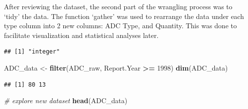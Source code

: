 \documentclass[12pt,]{article}
\newenvironment{Shaded}{\begin{snugshade}}{\end{snugshade}}
\newcommand{\KeywordTok}[1]{\textcolor[rgb]{0.13,0.29,0.53}{\textbf{#1}}}
\newcommand{\DecValTok}[1]{\textcolor[rgb]{0.00,0.00,0.81}{#1}}
\newcommand{\StringTok}[1]{\textcolor[rgb]{0.31,0.60,0.02}{#1}}
\newcommand{\CommentTok}[1]{\textcolor[rgb]{0.56,0.35,0.01}{\textit{#1}}}
\newcommand{\OperatorTok}[1]{\textcolor[rgb]{0.81,0.36,0.00}{\textbf{#1}}}
\newcommand{\NormalTok}[1]{#1}
\begin{document}
After reviewing the dataset, the second part of the wrangling process
was to `tidy' the data. The function `gather' was used to rearrange the
data under each type column into 2 new columns: ADC Type, and Quantity.
This was done to facilitate visualization and statistical analyses
later.

\begin{Shaded}
\end{Shaded}

\begin{verbatim}
## [1] "integer"
\end{verbatim}

\begin{Shaded}
\begin{Highlighting}[]
\NormalTok{ADC_data <-}\StringTok{ }\KeywordTok{filter}\NormalTok{(ADC_raw, Report.Year }\OperatorTok{>=}\StringTok{ }\DecValTok{1998}\NormalTok{)}
\KeywordTok{dim}\NormalTok{(ADC_data)}
\end{Highlighting}
\end{Shaded}

\begin{verbatim}
## [1] 80 13
\end{verbatim}

\begin{Shaded}
\begin{Highlighting}[]
\CommentTok{# explore new dataset}
\KeywordTok{head}\NormalTok{(ADC_data)}
\end{Highlighting}
\end{Shaded}
\end{document}
